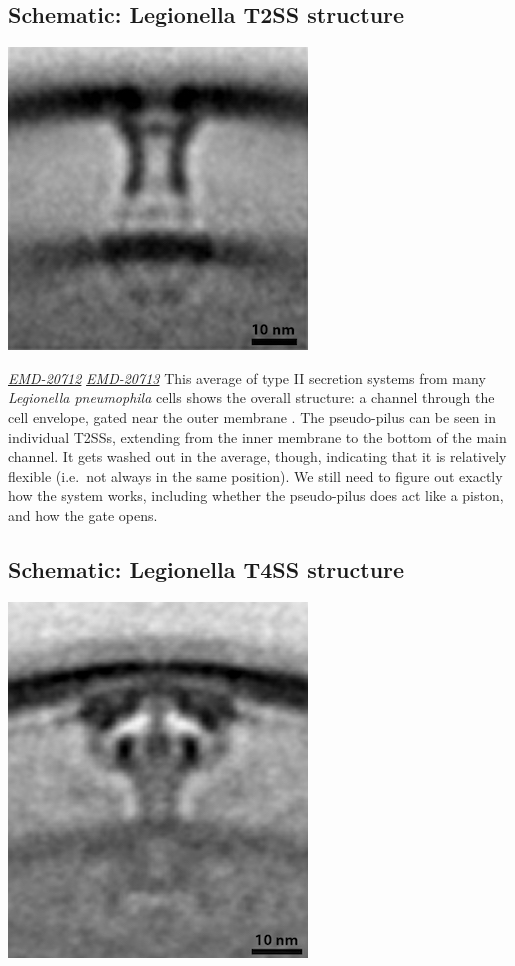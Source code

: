 \documentclass[]{tufte-book}
\begin{document}
\hypertarget{Legionella_T2SS_structure}{%
\subsection*{Schematic: Legionella T2SS structure}\label{Legionella_T2SS_structure}}

\includegraphics{img/schematics/9_3_1}

\href{https://www.ebi.ac.uk/pdbe/entry/emdb/EMD-20712}{\emph{EMD-20712}} \href{https://www.ebi.ac.uk/pdbe/entry/emdb/EMD-20713}{\emph{EMD-20713}}
This average of type II secretion systems from many \emph{Legionella pneumophila} cells shows the overall structure: a channel through the cell envelope, gated near the outer membrane \citep{ghosal2019}. The pseudo-pilus can be seen in individual T2SSs, extending from the inner membrane to the bottom of the main channel. It gets washed out in the average, though, indicating that it is relatively flexible (i.e.~not always in the same position). We still need to figure out exactly how the system works, including whether the pseudo-pilus does act like a piston, and how the gate opens.

\hypertarget{Legionella_T4SS_structure}{%
\subsection*{Schematic: Legionella T4SS structure}\label{Legionella_T4SS_structure}}

\includegraphics{img/schematics/9_3_2}
\end{document}
